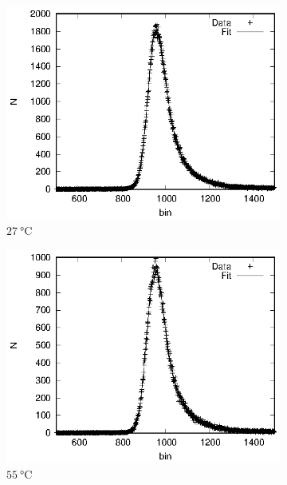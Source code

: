 \begin{figure}[h]
  \centering
  \begin{subfigure}[h]{0.49\textwidth}
    \centering
    \includegraphics[width=\textwidth]{evaluation_kilian/temp/na_roomtemp.eps}
    \caption{$\SI{27}{\celsius}$}
  \end{subfigure}%
  \begin{subfigure}[h]{0.49\textwidth}
    \centering
    \includegraphics[width=\textwidth]{evaluation_kilian/temp/na_55.eps}
    \caption{$\SI{55}{\celsius}$}
  \end{subfigure}
  \begin{subfigure}[h]{0.49\textwidth}
    \centering

\end{subfigure}
\end{figure}
